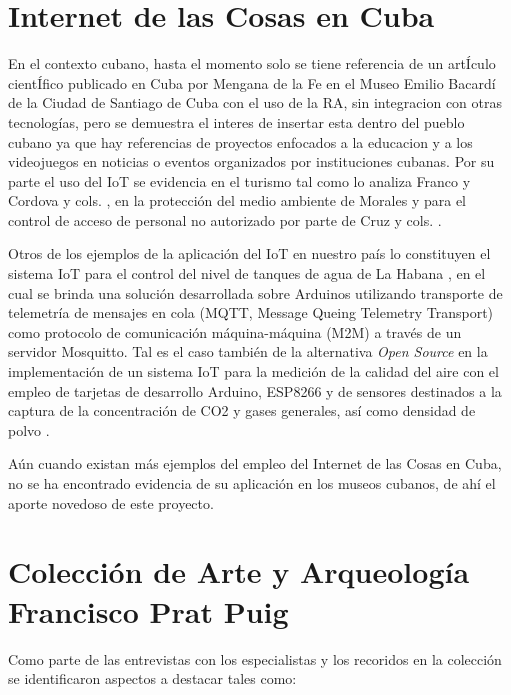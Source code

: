     \section{Internet de las Cosas en Cuba}\label{sec:iotCuba} 

    En el contexto cubano, hasta el momento solo se tiene referencia de un artÍculo cientÍfico publicado en Cuba por Mengana de la Fe \cite{lopezramos} en el Museo Emilio Bacardí de la Ciudad de Santiago de Cuba con el uso de la RA,
    sin integracion con otras tecnologías, pero se demuestra el interes de insertar esta dentro del pueblo cubano ya que hay referencias de proyectos enfocados a la educacion y a los videojuegos en noticias o eventos organizados por instituciones cubanas.
    Por su parte el uso del IoT se evidencia en el turismo tal como lo analiza Franco \cite{franco} y Cordova y cols. \cite{cordovacorso}, en la protección del medio ambiente de Morales \cite{morales} y para el control de acceso de personal no autorizado por parte de Cruz y cols. \cite{cruzrojas}.

    Otros de los ejemplos de la aplicación del IoT en nuestro país lo constituyen el sistema IoT para el control del nivel de tanques de agua de La Habana \cite{herrera2020}, en el cual se brinda una solución desarrollada sobre Arduinos utilizando transporte de telemetría de mensajes en cola (MQTT, Message Queing Telemetry Transport)
    como protocolo de comunicación máquina-máquina (M2M) a través de un servidor Mosquitto. Tal es el caso también de la alternativa \textit{Open Source} en la implementación de un sistema IoT para la medición de la calidad del aire con el empleo de tarjetas de desarrollo Arduino, ESP8266 y de sensores destinados a la captura de la concentración de CO2 y gases generales, así como densidad de polvo \cite{ochoa2018alternativa}.
    
    Aún cuando existan más ejemplos del empleo del Internet de las Cosas en Cuba, no se ha encontrado evidencia de su aplicación en los museos cubanos, de ahí el aporte novedoso de este proyecto.

    \section{Colección de Arte y Arqueología Francisco Prat Puig}

    Como parte de las entrevistas con los especialistas y los recoridos en la colección se identificaron aspectos a destacar tales como:

